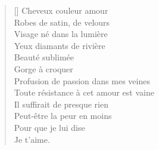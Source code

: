 


\settowidth{\versewidth}{Toute résistance à cet amour est vaine.}
\begin{verse}[\versewidth]
Cheveux couleur amour \\
Robes de satin, de velours \\
Visage né dans la lumière \\
Yeux diamants de rivière \\
Beauté sublimée \\
Gorge à croquer \\
Profusion de passion dans mes veines \\
Toute résistance à cet amour est vaine \\
Il suffirait de presque rien \\
Peut-être la peur en moins \\
Pour que je lui dise \\
Je t'aime.
\end{verse}